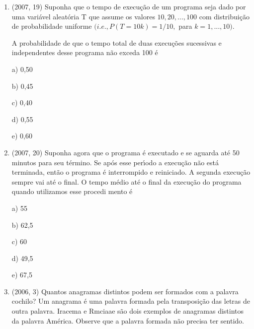 \documentclass{article}
\begin{document}
\begin{enumerate}
\textbf{RESOLUÇÃO}

$\rule[1cm]{100cm}{1px}$


6+5+4+3+2+1=21\newline



b) 21 \newline



\textbf{CONTEÚDO}

$\rule[1cm]{100cm}{1px}$

para o primeiro trablho temos 6 possobilidades de troca visto que pode ser trocada qualquer linha já no segundo temos apenas 5 visto que a posição anterior não pode ser trocada pois ficaria igual a primeira, aplicando a mesma lógica para os demais trabalhos 6+5+4+3+2+1=21

\newpage




\item(2007, 19) Suponha que o tempo de execução de um programa seja dado por uma variável aleatória T que assume os valores $10, 20, . . . , 100$ com distribuição de probabilidade uniforme $(i.e., P (T = 10k) = 1/10,$ para $k = 1, . . . , 10).$

A probabilidade de que o tempo total de duas execuções sucessivas e independentes desse programa não exceda 100 é

a) 0,50

b) 0,45

c) 0,40

d) 0,55

e) 0,60\newline


\item(2007, 20) Suponha agora que o programa é executado e se aguarda até 50 minutos para seu término. Se após esse perı́odo a execução não está terminada, então o programa é interrompido e reiniciado. A segunda execução sempre vai até o final. O tempo médio até o final da execução do programa quando utilizamos esse procedi mento é

a) 55

b) 62,5

c) 60

d) 49,5

e) 67,5\newline




\item(2006, 3) Quantos anagramas distintos podem ser formados com a palavra cochilo? Um
anagrama é uma palavra formada pela transposição das letras de outra palavra.
Iracema e Rmciaae são dois exemplos de anagramas distintos da palavra América.
Observe que a palavra formada não precisa ter sentido.


\end{enumerate}
\end{document}
